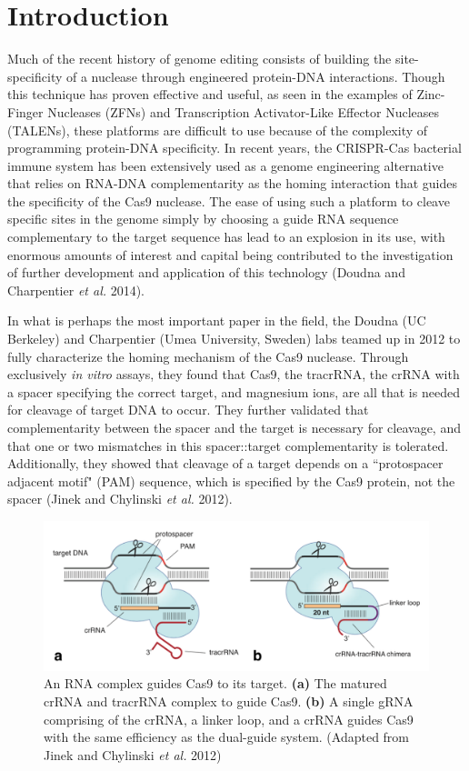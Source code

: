 \chapter{Introduction}
\label{introduction}

Much of the recent history of genome editing consists of building the site-specificity of a nuclease through engineered protein-DNA interactions. Though this technique has proven effective and useful, as seen in the examples of Zinc-Finger Nucleases (ZFNs) and Transcription Activator-Like Effector Nucleases (TALENs), these platforms are difficult to use because of the complexity of programming protein-DNA specificity.
In recent years, the CRISPR-Cas bacterial immune system has been extensively used as a genome engineering alternative that relies on RNA-DNA complementarity as the homing interaction that guides the specificity of the Cas9 nuclease. The ease of using such a platform to cleave specific sites in the genome simply by choosing a guide RNA sequence complementary to the target sequence has lead to an explosion in its use, with enormous amounts of interest and capital being contributed to the investigation of further development and application of this technology (Doudna and Charpentier \textit{et al.} 2014).

In what is perhaps the most important paper in the field, the Doudna (UC Berkeley) and Charpentier (Umea University, Sweden) labs teamed up in 2012 to fully characterize the homing mechanism of the Cas9 nuclease. Through exclusively \textit{in vitro} assays, they found that Cas9, the tracrRNA, the crRNA with a spacer specifying the correct target, and magnesium ions, are all that is needed for cleavage of target DNA to occur. They further validated that complementarity between the spacer and the target is necessary for cleavage, and that one or two mismatches in this spacer::target complementarity is tolerated. Additionally, they showed that cleavage of a target depends on a ``protospacer adjacent motif" (PAM) sequence, which is specified by the Cas9 protein, not the spacer (Jinek and Chylinski \textit{et al.} 2012).

\begin{figure}[!h]
	\begin{center}
	\centerline{
	\includegraphics[width=1.15\textwidth]{figures/grna.png}
	}
	\caption{An RNA complex guides Cas9 to its target. \textbf{(a)} The matured crRNA and tracrRNA complex to guide Cas9. \textbf{(b)} A single gRNA comprising of the crRNA, a linker loop, and a crRNA guides Cas9 with the same efficiency as the dual-guide system. (Adapted from Jinek and Chylinski \textit{et al.} 2012)}
	\label{fig:grna}
	\end{center}
\end{figure}

